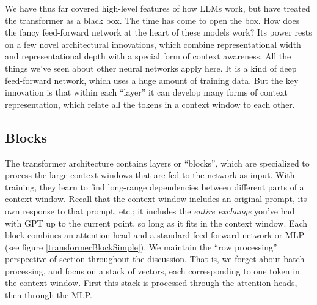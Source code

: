We have thus far covered high-level features of how LLMs work, but have treated the transformer as a black box. The time has come to open the box. How does the fancy feed-forward network at the heart of these models work? Its power rests on a few novel architectural innovations, which combine representational width and representational depth with a special form of context awareness. All the things we've seen about other neural networks apply here. It is a kind of deep feed-forward network, which uses a huge amount of training data. But the key innovation is that within each ``layer'' it can develop many forms of context representation, which relate all the tokens in a context window to each other.

\subsection{Blocks}

The transformer architecture \cite{vaswani2017attention} contains layers or ``blocks'', which are specialized to process the large context windows that are fed to the network as input. With training, they learn to find long-range dependencies between different parts of a context window. Recall that the context window  includes an original prompt, its own response to that prompt, etc.; it includes the \emph{entire exchange} you've had with GPT up to the current point, so long as it fits in the context window. Each block combines an attention head and a standard feed forward network or MLP (see figure \ref{transformerBlockSimple}). We maintain the ``row processing'' perspective of section  throughout the discussion. That is, we forget about batch processing, and focus on a stack of vectors, each corresponding to one token in the context window. First this stack is processed through the attention heads, then through the MLP.  


